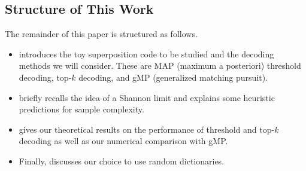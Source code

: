 \newpage

\subsection{Structure of This Work}

The remainder of this paper is structured as follows.

\begin{itemize}
\item {} introduces the toy superposition code to be studied and the decoding methods we will consider. These are MAP (maximum a posteriori) threshold decoding, top-$k$ decoding, and gMP (generalized matching pursuit).
\item {} briefly recalls the idea of a Shannon limit and explains some heuristic predictions for sample complexity.
\item {} gives our theoretical results on the performance of threshold and top-$k$ decoding as well as our numerical comparison with gMP.
\item Finally,  discusses our choice to use random dictionaries.
\end{itemize}
